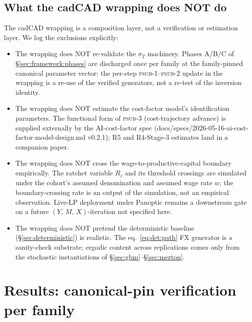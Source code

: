 \documentclass[11pt,letterpaper]{article}
\newcommand{\sigmaT}{\sigma_{T}}
\newcommand{\Ymx}{(Y,\,M,\,X)}
\begin{document}
\subsection{What the cadCAD wrapping does NOT do}
\label{sec:cadcad:nondoes}

The cadCAD wrapping is a composition layer, not a verification or
estimation layer. We log the exclusions explicitly:

\begin{itemize}
    \item The wrapping does NOT re-validate the $\sigmaT$ machinery.
        Phases A/B/C of \S\ref{sec:framework:phases} are discharged
        once per family at the family-pinned canonical parameter
        vector; the per-step \textsc{psub-1}--\textsc{psub-2} update
        in the wrapping is a re-use of the verified generators, not a
        re-test of the inversion identity.
    \item The wrapping does NOT estimate the cost-factor model's
        identification parameters. The functional form of
        \textsc{psub-3} (cost-trajectory advance) is supplied
        externally by the AI-cost-factor spec
        (\textsf{docs/specs/2026-05-16-ai-cost-factor-model-design.md}
        v0.2.1); R5 and R4-Stage-3 estimates land in a companion paper.
    \item The wrapping does NOT cross the wage-to-productive-capital
        boundary empirically. The ratchet variable $R_{j}$ and its
        threshold crossings are simulated under the cohort's assumed
        denomination and assumed wage rate $w$; the boundary-crossing
        rate is an output of the simulation, not an empirical
        observation. Live-LP deployment under Panoptic remains a
        downstream gate on a future \(\Ymx\)-iteration not specified
        here.
    \item The wrapping does NOT pretend the deterministic baseline
        (\S\ref{sec:deterministic}) is realistic. The eq.~\eqref{eq:det:path}
        FX generator is a sanity-check substrate; ergodic content
        across replications comes only from the stochastic
        instantiations of \S\ref{sec:gbm}--\S\ref{sec:merton}.
\end{itemize}

\section{Results: canonical-pin verification per family}
\label{sec:results}
\end{document}
